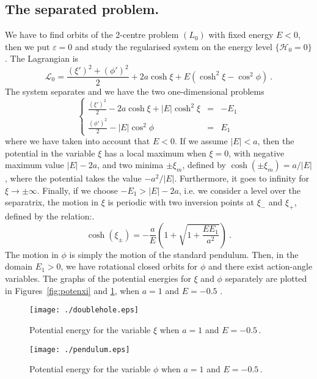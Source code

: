 \documentclass[a4paper]{article}
\begin{document}
\subsection{The separated problem.}
We have to find orbits of the 2-centre problem $(L_0)$ with fixed
energy $E<0$, then we put $\varepsilon=0$ and study the regularised
system on the energy level $\{\mathcal{H}_0=0\}$.  The Lagrangian is
\[
\mathcal{L}_0=\frac{(\xi')^2  + (\phi')^2}{2} +
2 a \cosh \xi  + E(\cosh^2 \xi-\cos^2\phi) \ .
\]
The system separates and we have the two one-dimensional problems
\begin{equation}
  \label{sys_reg}
  \left\{
  \begin{array}{rcl}
    \frac{(\xi')^2  }{2} -
    2a \cosh \xi  + |E|\cosh^2 \xi &= &  
    -E_1
    \\
    \frac{ (\phi')^2}{2} 
    - |E| \cos^2\phi&= & E_1
  \end{array}
  \right.
\end{equation}
where we have taken into account that $E<0$. If we assume $|E|<a$,
then the potential in the variable $\xi$ has a local maximum when
$\xi=0$, with negative maximum value $|E|-2a$, and two minima
$\pm\xi_{m}$, defined by $\cosh(\pm \xi_{m})=a/|E|$, where the
potential takes the value $-a^2/|E|$. Furthermore, it goes to infinity
for $\xi \rightarrow \pm \infty$.  Finally, if we choose
$-E_1>|E|-2a$, i.e. we consider a level over the separatrix, the
motion in $\xi$ is periodic with two inversion points at
$\xi_-$ and $\xi_+$, defined by the relation:.
\[
\cosh(\xi_{\pm})=
-\frac{a}{E}\left(1+\sqrt{1+\frac{EE_1}{a^2}}\right)
\ .
\]  
The motion in $\phi$ is simply the motion of the standard pendulum.
Then, in the domain $E_1>0$, we have rotational closed orbits for
$\phi$ and there exist action-angle variables.  The graphs of the
potential energies for $\xi$ and $\phi$ separately are plotted in
Figures~\ref{fig:potenxi} and \ref{fig:potenphi}, when $a=1$ and
$E=-0.5$ .
\begin{figure}[h]
  \begin{minipage}[b]{0.49\textwidth} 
   \centering
    
    \texttt{[image: ./doublehole.eps]}
    \caption{\small{Potential energy for the variable $\xi$ when $a=1$ and 
        $E=-0.5\,$.}}
    \label{fig:potenxi}
  \end{minipage}
  \hspace{2mm} 
  \begin{minipage}[b]{0.49\textwidth} 
    \centering
    
    \texttt{[image: ./pendulum.eps]}
    \caption{\small{Potential energy for the variable $\phi$ when $a=1$ 
        and $E=-0.5\,$.}}
    \label{fig:potenphi}
  \end{minipage}
\end{figure}
\end{document}
